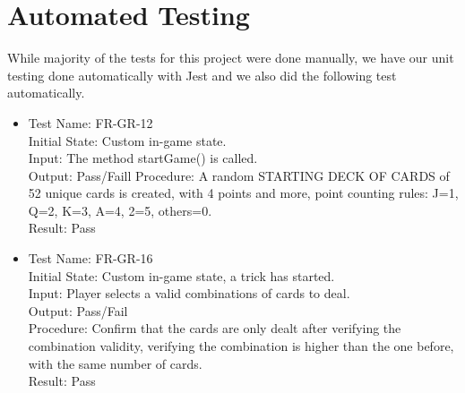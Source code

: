 \documentclass[12pt, titlepage]{article}
\begin{document}
\section{Automated Testing}
While majority of the tests for this project were done manually, we have our unit testing done automatically with Jest and we also did the following test automatically.

\begin{itemize}
    \item[] 
    Test Name: FR-GR-12\\
    Initial State: Custom in-game state.\\
    Input: The method startGame() is called.\\
	Output: Pass/Faill
	Procedure: A random STARTING DECK OF CARDS of 52 unique cards is created, with 4 points and more, point counting rules:  J=1, Q=2, K=3, A=4, 2=5, others=0.\\
	Result: Pass\\
    
    \item[] Test Name: FR-GR-16\\
    Initial State: Custom in-game state, a trick has started.\\
	Input: Player selects a valid combinations of cards to deal.\\
	Output: Pass/Fail\\
	Procedure: Confirm that the cards are only dealt after verifying the combination validity, verifying the combination is higher than the one before, with the same number of cards.\\
	Result: Pass\\
\end{itemize}
\end{document}
